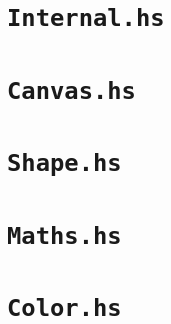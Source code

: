 \documentclass[../main.tex]{subfiles}
\begin{document}
        \section*{\texttt{Internal.hs}}
            
        \section*{\texttt{Canvas.hs}}
            
        \section*{\texttt{Shape.hs}}
            
        \section*{\texttt{Maths.hs}}
            
        \section*{\texttt{Color.hs}}
            
\end{document}
